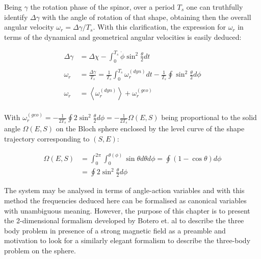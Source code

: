 Being $\gamma$ the rotation phase of the spinor, over a period $T_s$ one can truthfully identify $\Delta \gamma$ with the angle of rotation of that shape, obtaining then the overall angular velocity $\omega_r = \Delta \gamma /T_s$. With this clarification, the expression for $\omega_r$ in terms of the dynamical and geometrical angular velocities is easily deduced:

\begin{align*}
\Delta \gamma &= \Delta \chi - \int_0^{T_s}\dot{\phi}\sin^2{\frac{\theta}{2}}dt\\
\\
\omega_r &= \frac{\Delta \gamma}{T_s} = \frac{1}{T_s}\int_0^{T_s}\omega_r^{(dyn)}dt -\frac{1}{T_s}\oint\sin^2{\frac{\theta}{2}}d\phi\\
\\
\omega_r &= \left\langle \omega_r^{(dyn)} \right\rangle + \omega_r^{(geo)}\\
\end{align*}

With $\omega_r^{(geo)}= -\frac{1}{2T_s}\oint 2\sin^2{\frac{\theta}{2}}d\phi = -\frac{1}{2T_s}\Omega(E,S)$ being proportional to the solid angle $\Omega(E,S)$ on the Bloch sphere enclosed by the level curve of the shape trajectory corresponding to $(S,E)$:

\begin{align*}
\Omega(E,S) &= \int_0^{2\pi}\int_0^{\theta(\phi)} \sin{\theta}d\theta d\phi = \oint (1-\cos{\theta})d\phi\\ 
&= \oint 2\sin^2{\frac{\theta}{2}}d\phi
\end{align*}

The system may be analysed in terms of angle-action variables and with this method the frequencies deduced here can be formalised as canonical variables with unambiguous meaning. However, the purpose of this chapter is to present the 2-dimensional formalism developed by Botero et. al to describe the three body problem in presence of a strong magnetic field as a preamble and motivation to look for a similarly elegant formalism to describe the three-body problem on the sphere.





